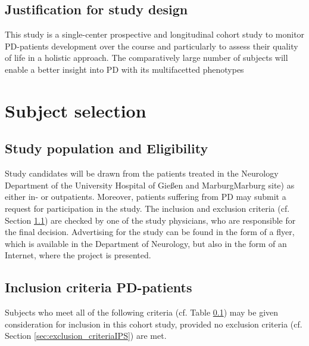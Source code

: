 \documentclass[
	a4paper, 
	11.5pt,
	headings=small, 
	twoside, 
	titlepage=firstiscover, 
 	pagesize=auto,
  	version=last,
	open=any,
	BCOR=14mm,
  	chapterprefix=false]{scrbook}
\newcommand{\UKGM}[1]{University Hospital of Gießen and Marburg}
\begin{document}
\subsection{Justification for study design}
This study is a single-center prospective and longitudinal cohort study to monitor \ac{PD}-patients development over the course and particularly to assess their quality of life in a holistic approach. The comparatively large number of subjects will enable a better insight into \ac{PD} with its multifacetted phenotypes

\section{Subject selection}
\label{sec:study_selection}
\subsection{Study population and Eligibility}
\label{sec:study_population}
Study candidates will be drawn from the patients treated in the Neurology Department of the \UKGM (Marburg site) as either in- or outpatients. Moreover, patients suffering from \ac{PD} may submit a request for participation in the study. The inclusion and exclusion criteria (cf. Section \ref{sec:study_population}) are checked by one of the study physicians, who are responsible for the final decision. Advertising for the study can be found in the form of a flyer, which is available in the Department of Neurology, but also in the form of an Internet, where the project is presented.

\subsection{Inclusion criteria \ac{PD}-patients}
\label{sec:inclusion_criteriaIPS}
Subjects who meet all of the following criteria (cf. Table \ref{}) may be given consideration for inclusion in this cohort study, provided no exclusion criteria (cf. Section \ref{sec:exclusion_criteriaIPS}) are met.
\end{document}
